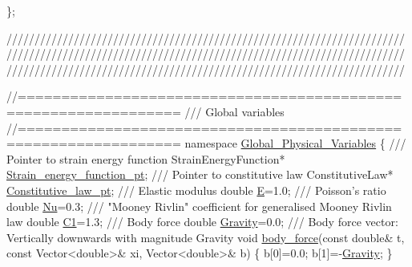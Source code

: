 \begin{DoxyCodeInclude}
\};



\textcolor{comment}{}
\textcolor{comment}{///////////////////////////////////////////////////////////////////////}
\textcolor{comment}{///////////////////////////////////////////////////////////////////////}
\textcolor{comment}{///////////////////////////////////////////////////////////////////////}
\textcolor{comment}{}



\textcolor{comment}{//================================================================}\textcolor{comment}{}
\textcolor{comment}{/// Global variables}
\textcolor{comment}{}\textcolor{comment}{//================================================================}
\textcolor{keyword}{namespace }\hyperlink{namespaceGlobal__Physical__Variables}{Global\_Physical\_Variables}
\{\textcolor{comment}{}
\textcolor{comment}{ /// Pointer to strain energy function}
\textcolor{comment}{} StrainEnergyFunction* \hyperlink{namespaceGlobal__Physical__Variables_a73135f793690b4386bf83bbefc7bf310}{Strain\_energy\_function\_pt};
\textcolor{comment}{}
\textcolor{comment}{ /// Pointer to constitutive law}
\textcolor{comment}{} ConstitutiveLaw* \hyperlink{namespaceGlobal__Physical__Variables_a2a37fb040c832ee7a086bb13bb02a100}{Constitutive\_law\_pt};
\textcolor{comment}{}
\textcolor{comment}{ /// Elastic modulus}
\textcolor{comment}{} \textcolor{keywordtype}{double} \hyperlink{namespaceGlobal__Physical__Variables_a09a019474b7405b35da2437f7779bc7e}{E}=1.0;
\textcolor{comment}{}
\textcolor{comment}{ /// Poisson's ratio}
\textcolor{comment}{} \textcolor{keywordtype}{double} \hyperlink{namespaceGlobal__Physical__Variables_a3962c36313826b19f216f6bbbdd6a477}{Nu}=0.3;
\textcolor{comment}{}
\textcolor{comment}{ /// "Mooney Rivlin" coefficient for generalised Mooney Rivlin law}
\textcolor{comment}{} \textcolor{keywordtype}{double} \hyperlink{namespaceGlobal__Physical__Variables_a849754fa7155c1a31481674ce4845658}{C1}=1.3;
\textcolor{comment}{}
\textcolor{comment}{ /// Body force}
\textcolor{comment}{} \textcolor{keywordtype}{double} \hyperlink{namespaceGlobal__Physical__Variables_a8b80d3e8d63b8d0a0ed435a2dd7fe2ad}{Gravity}=0.0;
\textcolor{comment}{}
\textcolor{comment}{ /// Body force vector: Vertically downwards with magnitude Gravity}
\textcolor{comment}{} \textcolor{keywordtype}{void} \hyperlink{namespaceGlobal__Physical__Variables_a313e702a9e8fdec808702c9bbf38b192}{body\_force}(\textcolor{keyword}{const} \textcolor{keywordtype}{double}& t,
                 \textcolor{keyword}{const} Vector<double>& xi,
                 Vector<double>& b)
 \{
  b[0]=0.0;
  b[1]=-\hyperlink{namespaceGlobal__Physical__Variables_a8b80d3e8d63b8d0a0ed435a2dd7fe2ad}{Gravity};
 \}


\end{DoxyCodeInclude}
